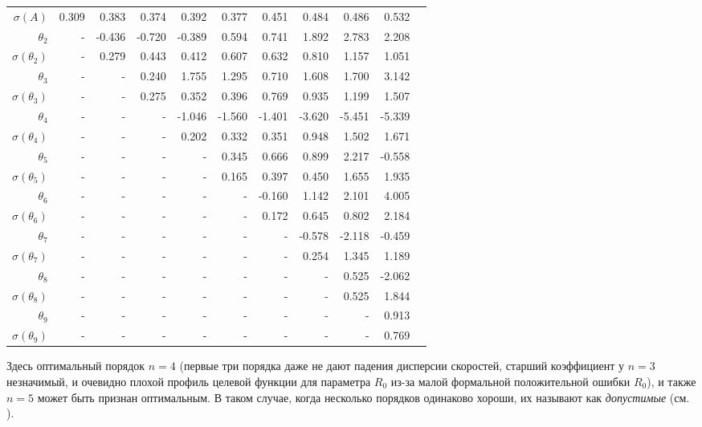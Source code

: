 \documentclass{matmex-diploma-custom}
\begin{document}
\begin{table}[h!!]
\begin{tabular}{r|rrr|rr|rrrrr}
 $\sigma(A) $ & 0.309       &   0.383 &   0.374 &   0.392 &   0.377 &   0.451 &   0.484 &   0.486 &   0.532 \\
 $\theta_2$&-        &  -0.436 &   -0.720 &  -0.389 &   0.594 &   0.741 &   1.892 &   2.783 &   2.208 \\
 $\sigma(\theta_2)$&-      &   0.279 &   0.443 &   0.412 &   0.607 &   0.632 &    0.810 &   1.157 &   1.051 \\
 $\theta_3$&-      &    - &   0.240 &   1.755 &   1.295 &   0.710 &   1.608 &   1.700 &   3.142 \\
 $\sigma(\theta_3)$&-      &    - &   0.275 &   0.352 &   0.396 &   0.769 &   0.935 &   1.199 &   1.507 \\
 $\theta_4$&-      &    - &    - &  -1.046 &  -1.560 &  -1.401 &  -3.620 &  -5.451 &  -5.339 \\
 $\sigma(\theta_4)$&-      &    - &    - &   0.202 &   0.332 &   0.351 &   0.948 &   1.502 &   1.671 \\
 $\theta_5$&-      &    - &    - &    - &  0.345 &   0.666 &   0.899 &   2.217 &  -0.558 \\
 $\sigma(\theta_5)$&-      &    - &    - &    - &   0.165 &   0.397 &   0.450 &   1.655 &   1.935 \\
 $\theta_6$&-      &    - &    - &    - &    - &   -0.160 &   1.142 &   2.101 &   4.005 \\
 $\sigma(\theta_6)$&-    &    - &    - &    - &    - &  0.172 &   0.645 &   0.802 &   2.184 \\
 $\theta_7$&-     &    - &    - &    - &    - &    - &  -0.578 &  -2.118 &  -0.459 \\
 $ \sigma(\theta_7)$&-     &    - &    - &    - &    - &    - &    0.254 &   1.345 &   1.189 \\
 $\theta_8$&-     &    - &    - &    - &    - &    - &    - &   0.525 &  -2.062 \\
 $ \sigma(\theta_8)$&-     &    - &    - &    - &    - &    - &    - &   0.525 &   1.844 \\
 $\theta_9$&-     &    - &    - &    - &    - &    - &    - &    - &  0.913 \\
 $ \sigma(\theta_9)$&-     &    - &    - &    - &    - &    - &    - &    - &   0.769 \\
\end{tabular}
\end{table}

\par Здесь оптимальный порядок $n=4$ (первые три порядка даже не дают падения дисперсии скоростей, старший коэффициент у $n=3$ незначимый, и очевидно плохой профиль целевой функции для параметра $R_0$ из-за малой формальной положительной ошибки $R_0$), и также $n =5$ может быть признан оптимальным. В таком случае, когда несколько порядков одинаково хороши, их называют как \textit{допустимые} (см. \cite{NII}).
\end{document}
